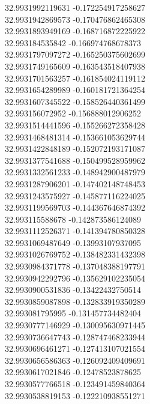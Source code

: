 {32.9931992119631	-0.172254917258627\\
32.9931942869573	-0.170476862465308\\
32.9931893949169	-0.168716872225922\\
32.993184535842	-0.166974768678373\\
32.9931797097272	-0.165250375602699\\
32.9931749165609	-0.163543518407938\\
32.9931701563257	-0.161854024119112\\
32.9931654289989	-0.160181721364254\\
32.9931607345522	-0.158526440361499\\
32.993156072952	-0.156888012906252\\
32.9931514441596	-0.155266272358428\\
32.9931468481314	-0.153661053629744\\
32.9931422848189	-0.152072193171087\\
32.9931377541688	-0.150499528959962\\
32.9931332561233	-0.148942900487979\\
32.9931287906201	-0.147402148748453\\
32.9931243575927	-0.145877116224025\\
32.9931199569703	-0.144367646874392\\
32.993115588678	-0.142873586124089\\
32.9931112526371	-0.141394780850328\\
32.9931069487649	-0.13993107937095\\
32.9931026769752	-0.138482331432398\\
32.9930984371778	-0.137048388197791\\
32.9930942292796	-0.135629102235054\\
32.9930900531836	-0.13422432750514\\
32.9930859087898	-0.132833919350289\\
32.993081795995	-0.131457734482404\\
32.9930777146929	-0.130095630971445\\
32.9930736647743	-0.128747468233944\\
32.9930696461271	-0.127413107021554\\
32.9930656586363	-0.126092409409691\\
32.9930617021846	-0.12478523878625\\
32.9930577766518	-0.123491459840364\\
32.9930538819153	-0.122210938551271\\
}
